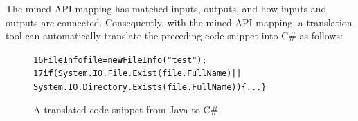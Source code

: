 The mined API mapping has matched inputs, outputs, and how inputs
and outputs are connected. Consequently, with the mined API mapping,
a translation tool can automatically translate the preceding code
snippet into C\# as follows:

\begin{figure}[t]
\begin{CodeOut}\vspace*{-1ex}
\begin{alltt}
16  FileInfo file = \textbf{new} FileInfo("test");
17  \textbf{if}(System.IO.File.Exist(file.FullName)||
       System.IO.Directory.Exists(file.FullName))\{...\}
\end{alltt}
\end{CodeOut}\vspace*{-1ex}
\caption{\label{fig:translatedcode} A translated code snippet from Java to C\#.}\vspace*{-1ex}
\end{figure}

